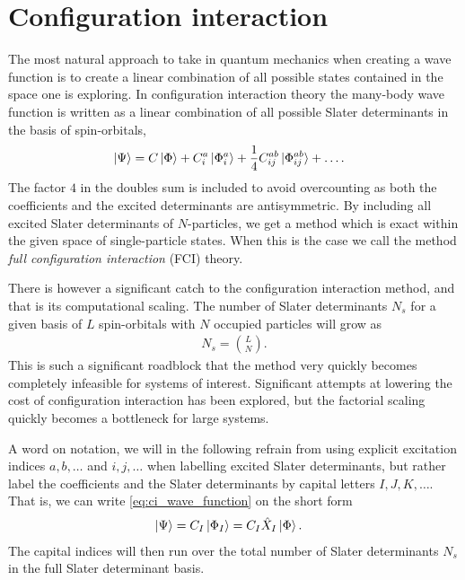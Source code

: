\chapter{Configuration interaction}
    \label{chap:ci}
    The most natural approach to take in quantum mechanics when creating a wave
    function is to create a linear combination of all possible states contained
    in the space one is exploring.
    In configuration interaction theory the many-body wave function is written
    as a linear combination of all possible Slater determinants in the basis of
    spin-orbitals,
    \begin{align}
        \ket*{\Psi}
        &= C\ket*{\Phi}
        + C^a_i\ket*{\Phi^{a}_{i}}
        + \frac{1}{4}C^{ab}_{ij}\ket*{\Phi^{ab}_{ij}}
        + \dots.
        \label{eq:ci_wave_function}
    \end{align}
    The factor $4$ in the doubles sum is included to avoid overcounting as both
    the coefficients and the excited determinants are antisymmetric.
    By including all excited Slater determinants of $N$-particles, we get a
    method which is exact within the given space of single-particle states.
    When this is the case we call the method \emph{full configuration
    interaction} (FCI) theory.

    There is however a significant catch to the configuration interaction
    method, and that is its computational scaling.
    The number of Slater determinants $N_{s}$ for a given basis of $L$
    spin-orbitals with $N$ occupied particles will grow as \cite{kvaal2017notes}
    \begin{align}
        N_{s} = \binom{L}{N}.
    \end{align}
    This is such a significant roadblock that the method very quickly becomes
    completely infeasible for systems of interest.
    Significant attempts at lowering the cost of configuration interaction has
    been explored, but the factorial scaling quickly becomes a bottleneck for
    large systems.

    A word on notation, we will in the following refrain from using explicit
    excitation indices $a, b, \dots$ and $i, j, \dots$ when labelling excited
    Slater determinants, but rather label the coefficients and the Slater
    determinants by capital letters $I, J, K, \dots$.
    That is, we can write \autoref{eq:ci_wave_function} on the short form
    \begin{align}
        \ket*{\Psi}
        &= C_{I}\ket*{\Phi_I}
        = C_{I}\hat{X}_I\ket*{\Phi}.
    \end{align}
    The capital indices will then run over the total number of Slater
    determinants $N_s$ in the full Slater determinant basis.

